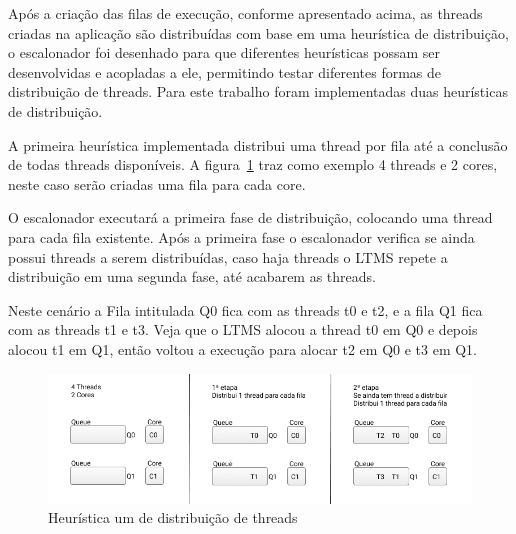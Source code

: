 \documentclass[diss,capa]{texufpel}
\begin{document}



Após a criação das filas de execução, conforme apresentado acima, as threads criadas na aplicação são distribuídas com base em uma heurística de distribuição, o escalonador foi desenhado para que diferentes heurísticas possam ser desenvolvidas e acopladas a ele, permitindo testar diferentes formas de distribuição de threads. Para este trabalho foram implementadas duas heurísticas de distribuição.

A primeira heurística implementada distribui uma thread por fila até a conclusão de todas threads disponíveis. A figura~\ref{queue_one} traz como exemplo 4 threads e 2 cores, neste caso serão criadas uma fila para cada core.

O escalonador executará a primeira fase de distribuição, colocando uma thread para cada fila existente. Após a primeira fase o escalonador verifica se ainda possui threads a serem distribuídas, caso haja threads o LTMS repete a distribuição em uma segunda fase, até acabarem as threads.

Neste cenário a Fila intitulada Q0 fica com as threads t0 e t2, e a fila Q1 fica com as threads t1 e t3. Veja que o LTMS alocou a thread t0 em Q0 e depois alocou t1 em Q1, então voltou a execução para alocar t2 em Q0 e t3 em Q1.

\begin{figure}[htbp]
 \centering
 \includegraphics[scale=.6]{images/Queue_one.png}
\caption{Heurística um de distribuição de threads}
\label{queue_one}
\end{figure}
\end{document}
